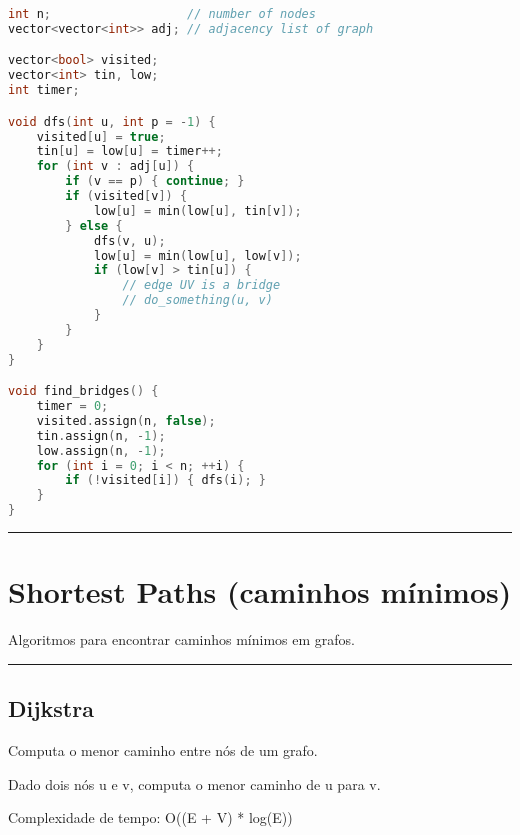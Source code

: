 \documentclass[11pt, a4paper, twoside]{book}
\begin{document}
\hfill

\begin{multicols}{2}
\begin{lstlisting}[language=C++]
int n;                   // number of nodes
vector<vector<int>> adj; // adjacency list of graph

vector<bool> visited;
vector<int> tin, low;
int timer;

void dfs(int u, int p = -1) {
    visited[u] = true;
    tin[u] = low[u] = timer++;
    for (int v : adj[u]) {
        if (v == p) { continue; }
        if (visited[v]) {
            low[u] = min(low[u], tin[v]);
        } else {
            dfs(v, u);
            low[u] = min(low[u], low[v]);
            if (low[v] > tin[u]) {
                // edge UV is a bridge
                // do_something(u, v)
            }
        }
    }
}

void find_bridges() {
    timer = 0;
    visited.assign(n, false);
    tin.assign(n, -1);
    low.assign(n, -1);
    for (int i = 0; i < n; ++i) {
        if (!visited[i]) { dfs(i); }
    }
}
\end{lstlisting}
\end{multicols}

\hfill

\rule{\textwidth}{0.4pt}

\section{Shortest Paths (caminhos mínimos)}



Algoritmos para encontrar caminhos mínimos em grafos.


\hfill

\rule{\textwidth}{0.4pt}

\subsection{Dijkstra}



Computa o menor caminho entre nós de um grafo.



\textbf{} 


Dado dois nós u e v, computa o menor caminho de u para v.



Complexidade de tempo: O((E + V) * log(E))



\textbf{} 
\end{document}
